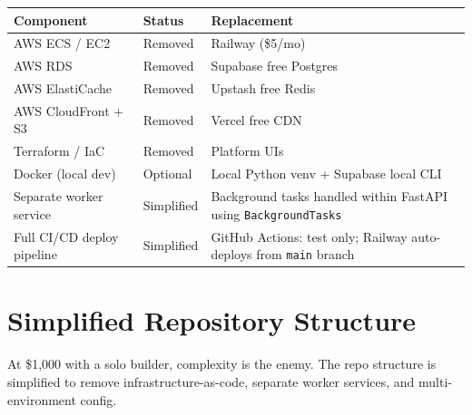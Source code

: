 \documentclass[12pt, a4paper]{article}
\begin{document}
\begin{table}[ht]
\centering
\renewcommand{\arraystretch}{1.3}
\begin{tabularx}{\textwidth}{X p{1.8cm} X}
\toprule
\rowcolor{pollitylightblue}
\textbf{Component} & \textbf{Status} & \textbf{Replacement} \\
\midrule
AWS ECS / EC2              & Removed & Railway (\$5/mo) \\
AWS RDS                    & Removed & Supabase free Postgres \\
AWS ElastiCache            & Removed & Upstash free Redis \\
AWS CloudFront + S3        & Removed & Vercel free CDN \\
Terraform / IaC            & Removed & Platform UIs \\
Docker (local dev)         & Optional & Local Python venv + Supabase local CLI \\
Separate worker service    & Simplified & Background tasks handled within FastAPI using \texttt{BackgroundTasks} \\
Full CI/CD deploy pipeline & Simplified & GitHub Actions: test only; Railway auto-deploys from \texttt{main} branch \\
\bottomrule
\end{tabularx}
\end{table}

\newpage

\section{Simplified Repository Structure}

At \$1,000 with a solo builder, complexity is the enemy. The repo structure is simplified to remove infrastructure-as-code, separate worker services, and multi-environment config.
\end{document}
